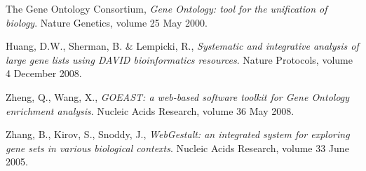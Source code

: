 \documentclass[11pt, oneside]{article}
\begin{document}
\begin{thebibliography}{}

	The Gene Ontology Consortium, 
	\emph{Gene Ontology: tool for the unification of biology}.
	Nature Genetics, volume 25
	May 2000.

	Huang, D.W., Sherman, B. \& Lempicki, R.,
	\emph{Systematic and integrative analysis of large gene lists using DAVID bioinformatics resources}.
	Nature Protocols, volume 4
	December 2008.

	Zheng, Q., Wang, X.,
	\emph{GOEAST: a web-based software toolkit for Gene Ontology enrichment analysis}.
	Nucleic Acids Research, volume 36
	May 2008.

	Zhang, B., Kirov, S., Snoddy, J.,
	\emph{WebGestalt: an integrated system for exploring gene sets in various biological contexts}.
	Nucleic Acids Research, volume 33
	June 2005.

\end{thebibliography}
\end{document}
